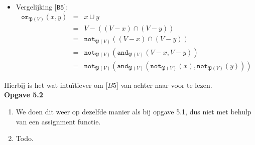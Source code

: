 \documentclass[a4paper,11pt]{article}
\begin{document}
\begin{itemize}
\item{Vergelijking $\texttt{[B5]}$:}
\begin{eqnarray*}
\texttt{or}_{\mathfrak{P}(V)}(x,y) & = & x \cup y \\
                                   & = & V - ((V - x) \cap (V - y)) \\
                                   & = & \texttt{not}_{\mathfrak{P}(V)}((V - x) \cap (V - y)) \\
                                   & = & \texttt{not}_{\mathfrak{P}(V)}(\texttt{and}_{\mathfrak{P}(V)}(V - x, V - y)) \\
                                   & = & \texttt{not}_{\mathfrak{P}(V)}(\texttt{and}_{\mathfrak{P}(V)}(\texttt{not}_{\mathfrak{P}(V)}(x),\texttt{not}_{\mathfrak{P}(V)}(y)))
\end{eqnarray*}

\end{itemize}

Hierbij is het wat intu\"itiever om $\texttt[B5]$ van achter naar voor te lezen.\\[2em]


{\bf Opgave 5.2}

\begin{enumerate}

\item %
We doen dit weer op dezelfde manier als bij opgave 5.1, dus niet met behulp
van een assignment functie.



\item %
Todo.

\end{enumerate}
\end{document}
